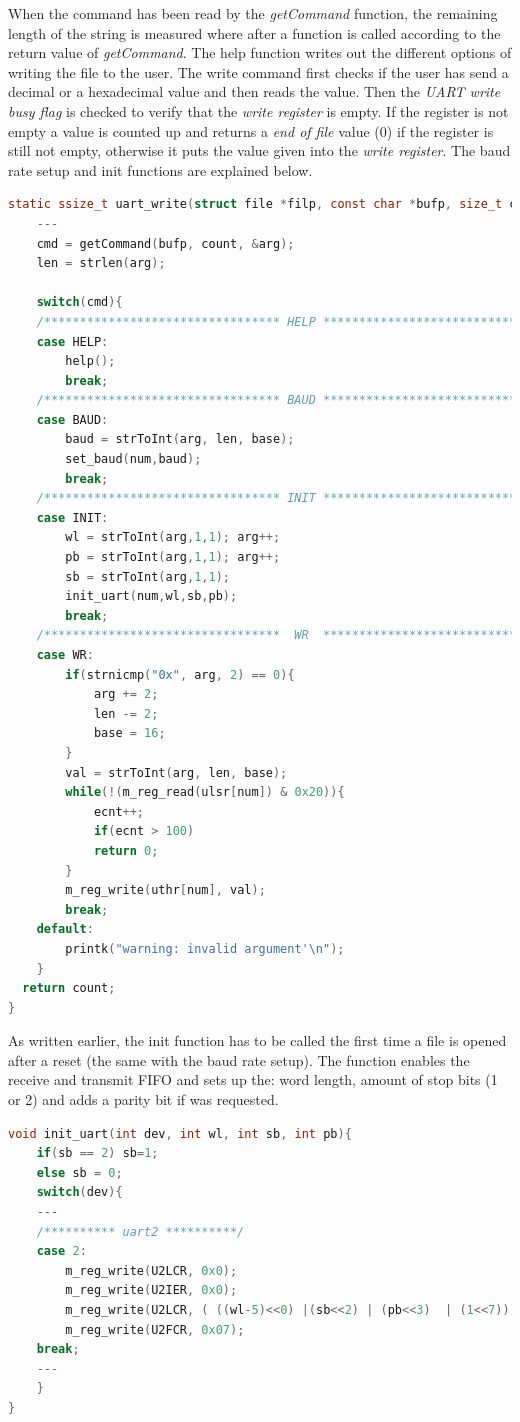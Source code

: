 When the command has been read by the \textit{getCommand} function, the remaining length of the string is measured where after a function is called according to the return value of \textit{getCommand}. The help function writes out the different options of writing the file to the user. The write command first checks if the user has send a decimal or a hexadecimal value and then reads the value. Then the \textit{UART write busy flag} is checked to verify that the \textit{write register} is empty. If the register is not empty a value is counted up and returns a \textit{end of file} value (0) if the register is still not empty, otherwise it puts the value given into the \textit{write register}. The baud rate setup and init functions are explained below.
\begin{lstlisting}[language=c]
static ssize_t uart_write(struct file *filp, const char *bufp, size_t count, loff_t *p_pos){
	---
	cmd = getCommand(bufp, count, &arg);
	len = strlen(arg);
	
	switch(cmd){
	/********************************* HELP ********************************************/
	case HELP:
	    help();
	    break;
	/********************************* BAUD ********************************************/
	case BAUD:
	    baud = strToInt(arg, len, base);
	    set_baud(num,baud);
	    break;
	/********************************* INIT ********************************************/
	case INIT:
	    wl = strToInt(arg,1,1); arg++;
	    pb = strToInt(arg,1,1); arg++;
	    sb = strToInt(arg,1,1);
	    init_uart(num,wl,sb,pb);
	    break;
	/*********************************  WR  ********************************************/
	case WR:
	    if(strnicmp("0x", arg, 2) == 0){
	        arg += 2;
	        len -= 2;
	        base = 16;
	    }
	    val = strToInt(arg, len, base);
	    while(!(m_reg_read(ulsr[num]) & 0x20)){
	        ecnt++;
	        if(ecnt > 100)
	        return 0;
	    }
	    m_reg_write(uthr[num], val);
	    break;
	default:
	    printk("warning: invalid argument'\n");
 	}
  return count;
}
\end{lstlisting}

As written earlier, the init function has to be called the first time a file is opened after a reset (the same with the baud rate setup). The function enables the receive and transmit FIFO and sets up the: word length, amount of stop bits (1 or 2) and adds a parity bit if was requested. 
\begin{lstlisting}[language=c]
void init_uart(int dev, int wl, int sb, int pb){
	if(sb == 2) sb=1;
	else sb = 0;
	switch(dev){
	---
	/********** uart2 **********/
	case 2:
	    m_reg_write(U2LCR, 0x0);
	    m_reg_write(U2IER, 0x0);
	    m_reg_write(U2LCR, ( ((wl-5)<<0) |(sb<<2) | (pb<<3)  | (1<<7)));
	    m_reg_write(U2FCR, 0x07);
	break;
	---
	}
}
\end{lstlisting}

